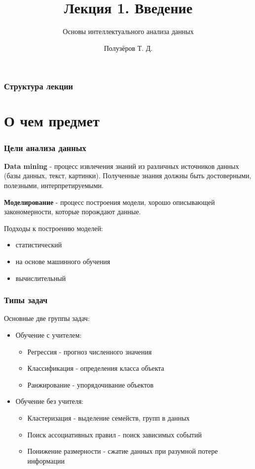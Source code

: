 \documentclass{beamer}
\title{Лекция 1. Введение}
\subtitle{Основы интеллектуального анализа данных}
\author{Полузёров Т. Д.}
\institute{БГУ ФПМИ}
\date{}
\begin{document}
	
	
	\begin{frame}
		\titlepage
	\end{frame}
	
	
	\begin{frame}
		\frametitle{Структура лекции}
		\tableofcontents
	\end{frame}


	\section{О чем предмет}
	
	
	\begin{frame}
		\frametitle{Цели анализа данных}
		\textbf{Data mining} - процесс извлечения знаний из различных источников данных (базы данных, текст, картинки). Полученные знания должны быть достоверными, полезными, интерпретируемыми.
		
		\vspace{5pt}
				
		\textbf{Моделирование} - процесс построения модели, хорошо описывающей закономерности, которые порождают данные.
		
		\vspace{5pt}		
		
		Подходы к построению моделей:
		\begin{itemize}
			\item статистический
			\item на основе машинного обучения
			\item вычислительный
		\end{itemize}
		
	\end{frame}
	
	
	\begin{frame}
		\frametitle{Типы задач}
		Основные две группы задач: 
		
		\begin{itemize}
			\item Обучение с учителем:
			\begin{itemize}
				\item Регрессия - прогноз численного значения 
				\item Классификация - определения класса объекта
				\item Ранжирование - упорядочивание объектов
			\end{itemize}
		
			\item Обучение без учителя:
			\begin{itemize}
				\item Кластеризация - выделение семейств, групп в данных
				\item Поиск ассоциативных правил - поиск зависимых событий
				\item Понижение размерности - сжатие данных при разумной 
				потере информации
			\end{itemize}
		\end{itemize}
	\end{frame}
\end{document}
